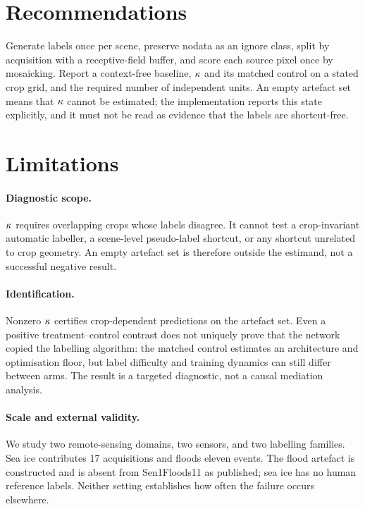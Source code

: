 \section{Recommendations}
\label{sec:recs}

Generate labels once per scene, preserve nodata as an ignore class, split by
acquisition with a receptive-field buffer, and score each source pixel once by
mosaicking. Report a context-free baseline, $\kappa$ and its matched control on a stated
crop grid, and the required number of independent units. An empty artefact set means
that $\kappa$ cannot be estimated; the implementation reports this state explicitly,
and it must not be read as evidence that the labels are shortcut-free.

\section{Limitations}
\label{sec:limits}

\paragraph{Diagnostic scope.} $\kappa$ requires overlapping crops whose labels
disagree. It cannot test a crop-invariant automatic labeller, a scene-level
pseudo-label shortcut, or any shortcut unrelated to crop geometry. An empty
artefact set is therefore outside the estimand, not a successful negative result.

\paragraph{Identification.} Nonzero $\kappa$ certifies crop-dependent predictions on
the artefact set. Even a positive treatment--control contrast does not uniquely
prove that the network copied the labelling algorithm: the matched control estimates
an architecture and optimisation floor, but label difficulty and training dynamics
can still differ between arms. The result is a targeted diagnostic, not a causal
mediation analysis.

\paragraph{Scale and external validity.} We study two remote-sensing domains, two
sensors, and two labelling families. Sea ice contributes 17 acquisitions and floods
eleven events. The flood artefact is constructed and is absent from Sen1Floods11 as
published; sea ice has no human reference labels. Neither setting establishes how
often the failure occurs elsewhere.

